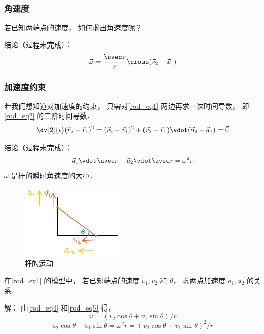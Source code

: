 \subsubsection{角速度}
若已知两端点的速度， 如何求出角速度呢？

结论（过程未完成）：
\begin{equation}\label{rod_eq4}
\vec \omega = \frac{\uvec r}{r} \cross (\vec v_2 - \vec v_1)
\end{equation}

\subsubsection{加速度约束}
若我们想知道对加速度的约束， 只需对\autoref{rod_eq1} 两边再求一次时间导数， 即\autoref{rod_eq2} 的二阶时间导数．
\begin{equation}
\dv[2]{t} (\vec r_2 - \vec r_1)^2 = (\vec v_2 - \vec v_1)^2 + (\vec r_2 - \vec r_1) \vdot (\vec a_2 - \vec a_1) = \vec 0
\end{equation}

结论（过程未完成）：
\begin{equation}\label{rod_eq5}
\vec a_1 \vdot \uvec r - \vec a_2 \vdot \uvec r  = \omega^2 r
\end{equation}
$\omega$ 是杆的瞬时角速度的大小．

\begin{exam}{}
\begin{figure}[ht]
\centering
\includegraphics[width=5cm]{./figures/rod2.png}
\caption{杆的运动} \label{rod_fig2}
\end{figure}
在\autoref{rod_ex1} 的模型中， 若已知端点的速度 $v_1, v_2$ 和 $\theta$， 求两点加速度 $a_1, a_2$ 的关系．

解： 由\autoref{rod_eq4} 和\autoref{rod_eq5} 得，
\begin{equation}
\omega = (v_2 \cos\theta + v_1 \sin\theta)/r
\end{equation}
\begin{equation}
a_2 \cos\theta - a_1 \sin\theta = \omega^2 r = (v_2 \cos\theta + v_1 \sin\theta)^2/r
\end{equation}
\end{exam}

